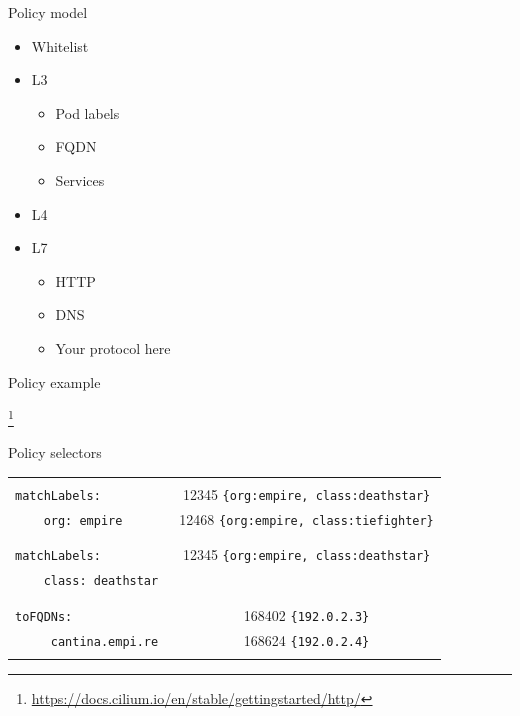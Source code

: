 \documentclass[black,white]{beamer}
\newcommand\blfootnote[1]{%
  \begingroup
  \renewcommand\thefootnote{}\footnote{#1}%
  \addtocounter{footnote}{-1}%
  \endgroup
}
\DeclareRobustCommand{\#}{\adjustbox{valign=B,totalheight=.57\baselineskip}{\oldhash}}%
\begin{document}
    \begin{frame}{Policy model}
        \begin{itemize}
            \item Whitelist \medskip
            \pause
            \item L3 \smallskip
                \begin{itemize}
                    \item Pod labels \medskip
                    \item FQDN \medskip
                    \item Services \medskip
                \end{itemize}
            \pause
            \item L4 \medskip
            \pause
            \item L7 \smallskip
                \begin{itemize}
                    \item HTTP \medskip
                    \item DNS \medskip
                    \item Your protocol here \medskip
                \end{itemize}
        \end{itemize}
    \end{frame}

    \begin{frame}{Policy example}
        
        \blfootnote{\tiny \url{https://docs.cilium.io/en/stable/gettingstarted/http/}}
    \end{frame}

    \begin{frame}[fragile]{Policy selectors}
        \begin{tabular}{ | l | c | }
            \hline
            & \\
            \verb+matchLabels:+ & 12345 \verb+{org:empire, class:deathstar}+ \\
            \verb+    org: empire+ & 12468 \verb+{org:empire, class:tiefighter}+ \\
            & \\
            \hline
            & \\
            \verb+matchLabels:+ & 12345 \verb+{org:empire, class:deathstar}+ \\
            \verb+    class: deathstar+ & \\
            & \\
            \hline
            & \\
            \verb+toFQDNs:+ & 168402 \verb+{192.0.2.3}+ \\
            \verb+     cantina.empi.re + & 168624 \verb+{192.0.2.4}+ \\
            & \\
            \hline
        \end{tabular}
    \end{frame}
\end{document}
